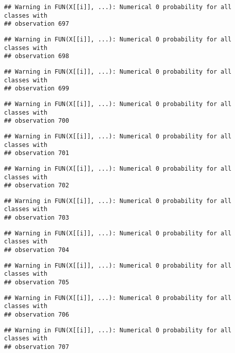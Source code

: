 \documentclass[
]{article}
\begin{document}
\begin{verbatim}
## Warning in FUN(X[[i]], ...): Numerical 0 probability for all classes with
## observation 697
\end{verbatim}

\begin{verbatim}
## Warning in FUN(X[[i]], ...): Numerical 0 probability for all classes with
## observation 698
\end{verbatim}

\begin{verbatim}
## Warning in FUN(X[[i]], ...): Numerical 0 probability for all classes with
## observation 699
\end{verbatim}

\begin{verbatim}
## Warning in FUN(X[[i]], ...): Numerical 0 probability for all classes with
## observation 700
\end{verbatim}

\begin{verbatim}
## Warning in FUN(X[[i]], ...): Numerical 0 probability for all classes with
## observation 701
\end{verbatim}

\begin{verbatim}
## Warning in FUN(X[[i]], ...): Numerical 0 probability for all classes with
## observation 702
\end{verbatim}

\begin{verbatim}
## Warning in FUN(X[[i]], ...): Numerical 0 probability for all classes with
## observation 703
\end{verbatim}

\begin{verbatim}
## Warning in FUN(X[[i]], ...): Numerical 0 probability for all classes with
## observation 704
\end{verbatim}

\begin{verbatim}
## Warning in FUN(X[[i]], ...): Numerical 0 probability for all classes with
## observation 705
\end{verbatim}

\begin{verbatim}
## Warning in FUN(X[[i]], ...): Numerical 0 probability for all classes with
## observation 706
\end{verbatim}

\begin{verbatim}
## Warning in FUN(X[[i]], ...): Numerical 0 probability for all classes with
## observation 707
\end{verbatim}
\end{document}
